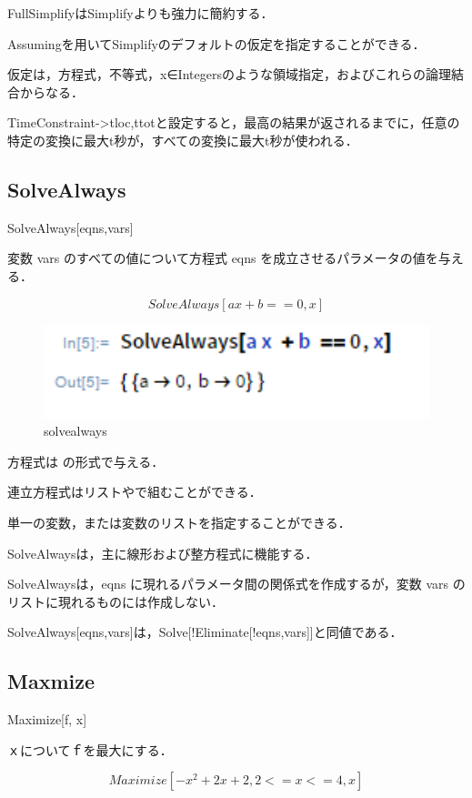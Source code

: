 FullSimplifyはSimplifyよりも強力に簡約する．

Assumingを用いてSimplifyのデフォルトの仮定を指定することができる．

仮定は，方程式，不等式，x∈Integersのような領域指定，およびこれらの論理結合からなる．

TimeConstraint->{tloc,ttot}と設定すると，最高の結果が返されるまでに，任意の特定の変換に最大t秒が，すべての変換に最大t秒が使われる．



\subsection {SolveAlways}

SolveAlways[eqns,vars]

変数 vars のすべての値について方程式 eqns を成立させるパラメータの値を与える．

\[SolveAlways[a x + b == 0, x]\]

\begin{figure}[h]
\centering
\includegraphics[width=15cm]{solvealways.png}
\caption{solvealways}\label{図}
\end{figure}

方程式は  の形式で与える．

連立方程式はリストやで組むことができる．

単一の変数，または変数のリストを指定することができる．

SolveAlwaysは，主に線形および整方程式に機能する．

SolveAlwaysは，eqns に現れるパラメータ間の関係式を作成するが，変数 vars のリストに現れるものには作成しない．

SolveAlways[eqns,vars]は，Solve[!Eliminate[!eqns,vars]]と同値である．

\subsection {Maxmize}

Maximize[f, x]

ｘについてｆを最大にする．

\[Maximize[{-x^2 +2x+2,2<= x <= 4},x]\]

